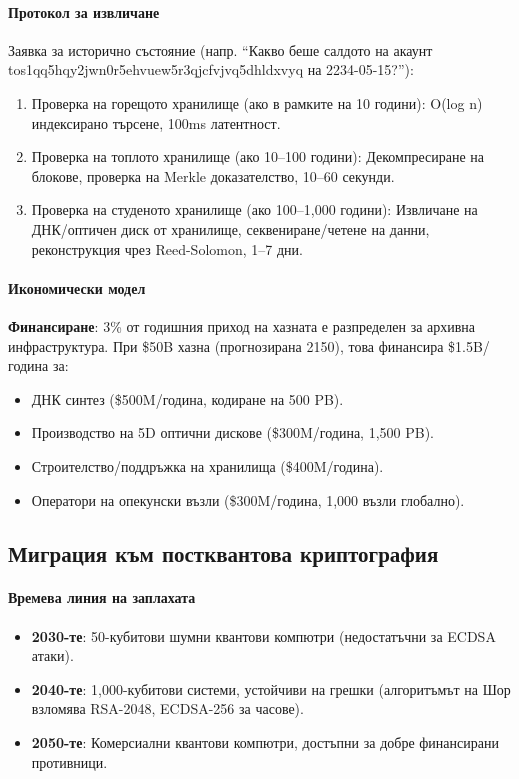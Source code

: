 \documentclass[11pt]{article}
\begin{document}
\paragraph{Протокол за извличане}
Заявка за исторично състояние (напр. ``Какво беше салдото на акаунт tos1qq5hqy2jwn0r5ehvuew5r3qjcfvjvq5dhldxvyq на 2234-05-15?''):
\begin{enumerate}[noitemsep]
  \item Проверка на горещото хранилище (ако в рамките на 10 години): O(log n) индексирано търсене, 100ms латентност.
  \item Проверка на топлото хранилище (ако 10--100 години): Декомпресиране на блокове, проверка на Merkle доказателство, 10--60 секунди.
  \item Проверка на студеното хранилище (ако 100--1,000 години): Извличане на ДНК/оптичен диск от хранилище, секвениране/четене на данни, реконструкция чрез Reed-Solomon, 1--7 дни.
\end{enumerate}

\paragraph{Икономически модел}
\textbf{Финансиране}: 3\% от годишния приход на хазната е разпределен за архивна инфраструктура. При \$50B хазна (прогнозирана 2150), това финансира \$1.5B/година за:
\begin{itemize}[noitemsep]
  \item ДНК синтез (\$500M/година, кодиране на 500 PB).
  \item Производство на 5D оптични дискове (\$300M/година, 1,500 PB).
  \item Строителство/поддръжка на хранилища (\$400M/година).
  \item Оператори на опекунски възли (\$300M/година, 1,000 възли глобално).
\end{itemize}

\subsection{Миграция към постквантова криптография}

\paragraph{Времева линия на заплахата}
\begin{itemize}[noitemsep]
  \item \textbf{2030-те}: 50-кубитови шумни квантови компютри (недостатъчни за ECDSA атаки).
  \item \textbf{2040-те}: 1,000-кубитови системи, устойчиви на грешки (алгоритъмът на Шор взломява RSA-2048, ECDSA-256 за часове).
  \item \textbf{2050-те}: Комерсиални квантови компютри, достъпни за добре финансирани противници.
\end{itemize}
\end{document}
